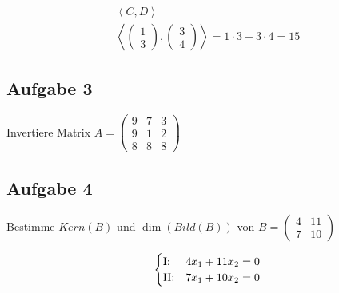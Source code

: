 \begin{align*}
    \left<C, D\right> \\
    \left< \begin{pmatrix}
               1 \\ 3
           \end{pmatrix}, \begin{pmatrix}
                              3 \\ 4
                          \end{pmatrix}\right> = 1 \cdot 3 + 3 \cdot 4 = 15
\end{align*}

\subsection{Aufgabe 3}

Invertiere Matrix $A = \begin{pmatrix}
        9 & 7 & 3 \\
        9 & 1 & 2 \\
        8 & 8 & 8
    \end{pmatrix}$

\subsection{Aufgabe 4}

Bestimme $Kern(B)$ und $\dim(Bild(B))$ von $B = \begin{pmatrix}
        4 & 11 \\
        7 & 10
    \end{pmatrix}$

\begin{align*}
    \begin{cases}
        \text{I:\@}  & 4x_1 + 11x_2 = 0 \\
        \text{II:\@} & 7x_1 + 10x_2 = 0 \\
    \end{cases}
\end{align*}

